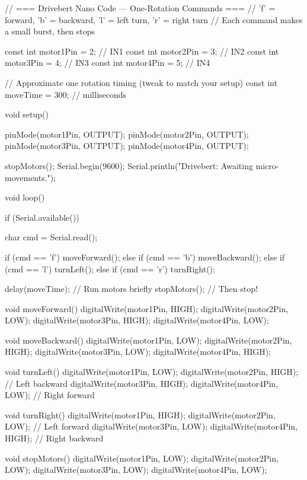// === Drivebert Nano Code — One-Rotation Commands ===
// 'f' = forward, 'b' = backward, 'l' = left turn, 'r' = right turn
// Each command makes a small burst, then stops

const int motor1Pin = 2; // IN1
const int motor2Pin = 3; // IN2
const int motor3Pin = 4; // IN3
const int motor4Pin = 5; // IN4

// Approximate one rotation timing (tweak to match your setup)
const int moveTime = 300; // milliseconds

void setup() {
  pinMode(motor1Pin, OUTPUT);
  pinMode(motor2Pin, OUTPUT);
  pinMode(motor3Pin, OUTPUT);
  pinMode(motor4Pin, OUTPUT);

  stopMotors();
  Serial.begin(9600);
  Serial.println("Drivebert: Awaiting micro-movements.");
}

void loop() {
  if (Serial.available()) {
    char cmd = Serial.read();

    if (cmd == 'f') {
      moveForward();
    } else if (cmd == 'b') {
      moveBackward();
    } else if (cmd == 'l') {
      turnLeft();
    } else if (cmd == 'r') {
      turnRight();
    }

    delay(moveTime);   // Run motors briefly
    stopMotors();      // Then stop!
  }
}

void moveForward() {
  digitalWrite(motor1Pin, HIGH); digitalWrite(motor2Pin, LOW);
  digitalWrite(motor3Pin, HIGH); digitalWrite(motor4Pin, LOW);
}

void moveBackward() {
  digitalWrite(motor1Pin, LOW); digitalWrite(motor2Pin, HIGH);
  digitalWrite(motor3Pin, LOW); digitalWrite(motor4Pin, HIGH);
}

void turnLeft() {
  digitalWrite(motor1Pin, LOW); digitalWrite(motor2Pin, HIGH); // Left backward
  digitalWrite(motor3Pin, HIGH); digitalWrite(motor4Pin, LOW); // Right forward
}

void turnRight() {
  digitalWrite(motor1Pin, HIGH); digitalWrite(motor2Pin, LOW);  // Left forward
  digitalWrite(motor3Pin, LOW); digitalWrite(motor4Pin, HIGH);  // Right backward
}

void stopMotors() {
  digitalWrite(motor1Pin, LOW);
  digitalWrite(motor2Pin, LOW);
  digitalWrite(motor3Pin, LOW);
  digitalWrite(motor4Pin, LOW);
}
